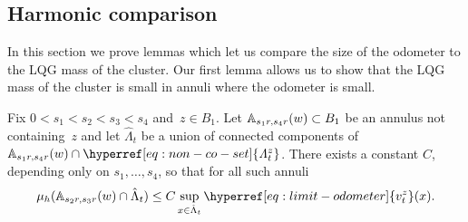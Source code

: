 \documentclass[12pt]{amsart}
\numberwithin{equation}{section}
\newcommand{\cluster}[2]{\hyperref[eq:non-co-set]{\mathit{\Lambda}^{#1}_{#2}}}
\newcommand{\odometer}[2]{\hyperref[eq:limit-odometer]{v^{#1}_{#2}}}
\begin{document}
	
	\subsection{Harmonic comparison} \label{subsec:odometer-cluster-comparison}
	In this section we prove lemmas which let us compare the size of the odometer to the LQG mass of the cluster.
	Our first lemma allows us to show that the LQG mass of the cluster is small in annuli where the odometer is small. 
	\begin{lemma} \label{lemma:odometer-annuli}
		Fix $0 < s_1 < s_2 < s_3 < s_4$ and~$z \in B_{1}$.
		Let $\mathbb{A}_{s_1 r, s_4 r}(w) \subset B_1$ be an annulus not containing~$z$
		and let $\hat \Lambda_t$ be a union of connected components of $\A_{s_1 r, s_4 r}(w) \cap {\cluster{z}{t}}$.
		There exists a constant $C$, depending only on $s_{1},\ldots,s_4$,  
		so that for all such annuli
		\[
		\mu_h(\A_{s_2 r, s_3 r}(w) \cap \hat \Lambda_t) \leq C \sup_{x \in \hat \Lambda_t} \odometer{z}{t}(x).
		\]
	\end{lemma}
	
\end{document}
